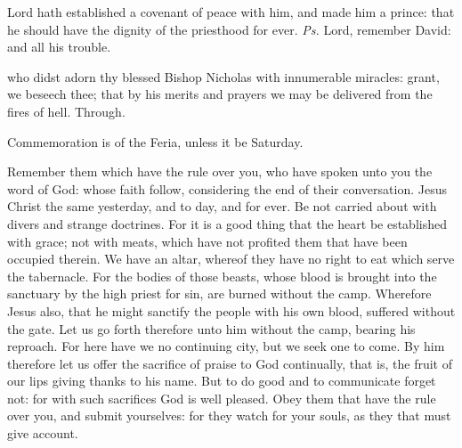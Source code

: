 \introit
{} Lord hath established a covenant of peace with him, and made him a prince: that he should have the dignity of the priesthood for ever. \textit{Ps.} Lord, remember David: and all his trouble.

\collect
{} who didst adorn thy blessed Bishop Nicholas with innumerable miracles: grant, we beseech thee; that by his merits and prayers we may be delivered from the fires of hell. Through.

\begin{rubric}
	Commemoration is of the Feria, unless it be Saturday.
\end{rubric}

 Remember them which have the rule over you, who have spoken unto you the word of God: whose faith follow, considering the end of their conversation. Jesus Christ the same yesterday, and to day, and for ever. Be not carried about with divers and strange doctrines. For it is a good thing that the heart be established with grace; not with meats, which have not profited them that have been occupied therein. We have an altar, whereof they have no right to eat which serve the tabernacle. For the bodies of those beasts, whose blood is brought into the sanctuary by the high priest for sin, are burned without the camp. Wherefore Jesus also, that he might sanctify the people with his own blood, suffered without the gate. Let us go forth therefore unto him without the camp, bearing his reproach. For here have we no continuing city, but we seek one to come. By him therefore let us offer the sacrifice of praise to God continually, that is, the fruit of our lips giving thanks to his name. But to do good and to communicate forget not: for with such sacrifices God is well pleased. Obey them that have the rule over you, and submit yourselves: for they watch for your souls, as they that must give account.



